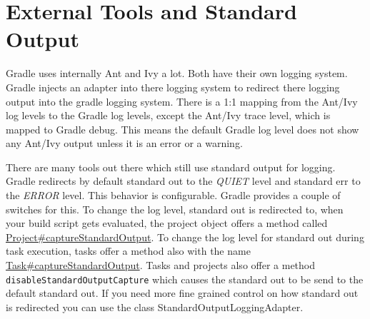 \section{External Tools and Standard Output} %
\label{sec:external_tools}
Gradle uses internally Ant and Ivy a lot. Both have their own logging system. Gradle injects an adapter into there logging system to redirect there logging output into the gradle logging system. There is a 1:1 mapping from the Ant/Ivy log levels to the Gradle log levels, except the Ant/Ivy trace level, which is mapped to Gradle debug. This means the default Gradle log level does not show any Ant/Ivy output unless it is an error or a warning. 

There are many tools out there which still use standard output for logging. Gradle redirects by default standard out to the \emph{QUIET} level and standard err to the \emph{ERROR} level. This behavior is configurable. Gradle provides a couple of switches for this. To change the log level, standard out is redirected to, when your build script gets evaluated, the project object offers a method called \href{\API Project.html}{Project\#captureStandardOutput}. To change the log level for standard out during task execution, tasks offer a method also with the name \href{\API Task.html}{Task\#captureStandardOutput}. Tasks and projects also offer a method \texttt{disableStandardOutputCapture} which causes the standard out to be send to the default standard out. If you need more fine grained control on how standard out is redirected you can use the class StandardOutputLoggingAdapter.

